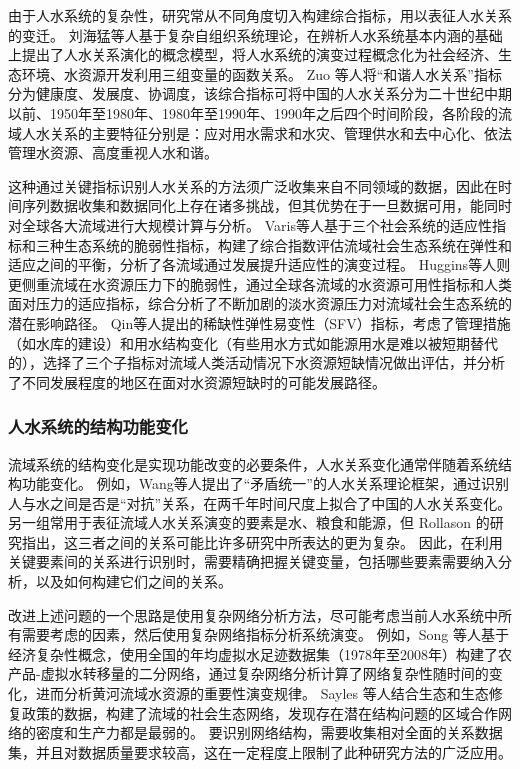 由于人\textendash{}水系统的复杂性，研究常从不同角度切入构建综合指标，用以表征人\textendash{}水关系的变迁。
刘海猛等人基于复杂自组织系统理论，在辨析人\textendash{}水系统基本内涵的基础上提出了人\textendash{}水关系演化的概念模型，将人\textendash{}水系统的演变过程概念化为社会经济、生态环境、水资源开发利用三组变量的函数关系\cite{liu2014}。
Zuo 等人将“和谐人\textendash{}水关系”指标分为健康度、发展度、协调度\cite{zuo2008}，该综合指标可将中国的人\textendash{}水关系分为二十世纪中期以前、1950年至1980年、1980年至1990年、1990年之后四个时间阶段，各阶段的流域人\textendash{}水关系的主要特征分别是：应对用水需求和水灾、管理供水和去中心化、依法管理水资源、高度重视人水和谐\cite{zuo2016a}。

这种通过关键指标识别人\textendash{}水关系的方法须广泛收集来自不同领域的数据，因此在时间序列数据收集和数据同化上存在诸多挑战，但其优势在于一旦数据可用，能同时对全球各大流域进行大规模计算与分析。
Varis等人基于三个社会系统的适应性指标和三种生态系统的脆弱性指标，构建了综合指数评估流域社会\textendash{}生态系统在弹性和适应之间的平衡，分析了各流域通过发展提升适应性的演变过程\cite{varis2019}。
Huggins等人则更侧重流域在水资源压力下的脆弱性，通过全球各流域的水资源可用性指标和人类面对压力的适应指标，综合分析了不断加剧的淡水资源压力对流域社会\textendash{}生态系统的潜在影响路径\cite{huggins2022}。
Qin等人提出的稀缺性\textendash{}弹性\textendash{}易变性（SFV）指标，考虑了管理措施（如水库的建设）和用水结构变化（有些用水方式如能源用水是难以被短期替代的），选择了三个子指标对流域人类活动情况下水资源短缺情况做出评估，并分析了不同发展程度的地区在面对水资源短缺时的可能发展路径\cite{qin2019}。

\subsubsection{人\textendash{}水系统的结构功能变化}

流域系统的结构变化是实现功能改变的必要条件，人\textendash{}水关系变化通常伴随着系统结构功能变化。
例如，Wang等人提出了“矛盾统一”的人\textendash{}水关系理论框架，通过识别人与水之间是否是“对抗”关系，在两千年时间尺度上拟合了中国的人\textendash{}水关系变化\cite{wang2017}。
另一组常用于表征流域人\textendash{}水关系演变的要素是水、粮食和能源，但 Rollason 的研究指出，这三者之间的关系可能比许多研究中所表达的更为复杂\cite{rollason2021}。
因此，在利用关键要素间的关系进行识别时，需要精确把握关键变量，包括哪些要素需要纳入分析，以及如何构建它们之间的关系\cite{zhangzongyong2020, wang2021}。

改进上述问题的一个思路是使用复杂网络分析方法，尽可能考虑当前人\textendash{}水系统中所有需要考虑的因素，然后使用复杂网络指标分析系统演变\cite{sayles2019, bodin2017b}。
例如，Song 等人基于经济复杂性概念，使用全国的年均虚拟水足迹数据集（1978年至2008年）构建了农产品-虚拟水转移量的二分网络，通过复杂网络分析计算了网络复杂性随时间的变化，进而分析黄河流域水资源的重要性演变规律\cite{song2022}。
Sayles 等人结合生态和生态修复政策的数据，构建了流域的社会\textendash{}生态网络，发现存在潜在结构问题的区域合作网络的密度和生产力都是最弱的\cite{sayles2017}。
要识别网络结构，需要收集相对全面的关系数据集，并且对数据质量要求较高，这在一定程度上限制了此种研究方法的广泛应用。

